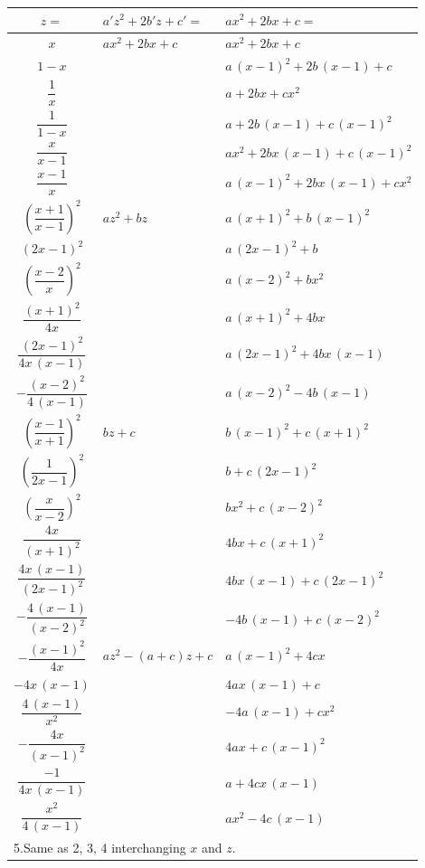 \documentclass[11pt,a4paper]{book}
\begin{document}
\begin{center}
\small
\begin{tabular}{|c|l|l|}
\hline
$z=$ & $a'z^2+2b'z+c'=$ & $ax^2+2bx+c=$\\
\hline
$x$ & $ax^2+2bx+c$ & $ax^2+2bx+c$\\
$1-x$ & \quad\phantom{''} & $a\,(x-1)^2+2b\,(x-1)+c$\\
$\dfrac{1}{x}$ & \quad\phantom{''} & $a+2bx+cx^2$\\
$\dfrac{1}{1-x}$ & \quad\phantom{''} & $a+2b\,(x-1)+c\,(x-1)^2$\\
$\dfrac{x}{x-1}$ & \quad\phantom{''} & $ax^2+2bx\,(x-1)+c\,(x-1)^2$\\
$\dfrac{x-1}{x}$ & \quad\phantom{''} & $a\,(x-1)^2+2bx\,(x-1)+cx^2$\\
\hline
$\left(\dfrac{x+1}{x-1}\right)^2$ & $az^2+bz$ & $a\,(x+1)^2+b\,(x-1)^2$\\
$(2x-1)^2$ & \quad\phantom{''} & $a\,(2x-1)^2+b$\\
$\left(\dfrac{x-2}{x}\right)^2$ & \quad\phantom{''} & $a\,(x-2)^2+bx^2$\\
$\dfrac{(x+1)^2}{4x}$ & \quad\phantom{''} & $a\,(x+1)^2+4bx$\\
$\dfrac{(2x-1)^2}{4x\,(x-1)}$ & \quad\phantom{''} & $a\,(2x-1)^2+4bx\,(x-1)$\\
$-\dfrac{(x-2)^2}{4\,(x-1)}$ & \quad\phantom{''} & $a\,(x-2)^2-4b\,(x-1)$\\
\hline
$\left(\dfrac{x-1}{x+1}\right)^2$ & $bz+c$ & $b\,(x-1)^2+c\,(x+1)^2$\\
$\left(\dfrac{1}{2x-1}\right)^2$ & \quad\phantom{''} & $b+c\,(2x-1)^2$\\
$\left(\dfrac{x}{x-2}\right)^2$ & \quad\phantom{''} & $bx^2+c\,(x-2)^2$\\
$\dfrac{4x}{(x+1)^2}$ & \quad\phantom{''} & $4bx+c\,(x+1)^2$\\
$\dfrac{4x\,(x-1)}{(2x-1)^2}$ & \quad\phantom{''} & $4bx\,(x-1)+c\,(2x-1)^2$\\
$-\dfrac{4\,(x-1)}{(x-2)^2}$ & \quad\phantom{''} & $-4b\,(x-1)+c\,(x-2)^2$\\
\hline
$-\dfrac{(x-1)^2}{4x}$ & $az^2-(a+c)z+c$ & $a\,(x-1)^2+4cx$\\
$-4x\,(x-1)$ & \quad\phantom{''} & $4ax\,(x-1)+c$\\
$\dfrac{4\,(x-1)}{x^2}$ & \quad\phantom{''} & $-4a\,(x-1)+cx^2$\\
$-\dfrac{4x}{(x-1)^2}$ & \quad\phantom{''} & $4ax+c\,(x-1)^2$\\
$\dfrac{-1}{4x\,(x-1)}$ & \quad\phantom{''} & $a+4cx\,(x-1)$\\
$\dfrac{x^2}{4\,(x-1)}$ & \quad\phantom{''} & $ax^2-4c\,(x-1)$\\
\hline
\multicolumn{3}{|l|}{5.\hspace{2em}Same as 2, 3, 4 interchanging $x$ and $z$.}\\
\hline
\end{tabular}
\end{center}
\end{document}
